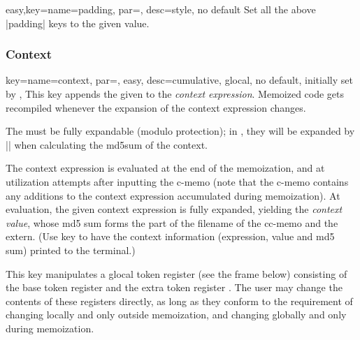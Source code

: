 \documentclass[a4paper,11pt]{article}
\begin{document}
\begin{doc}{easy,key={name=padding, par=, desc={style, no default}}}
  Set all the above |padding| keys to the given value.
\end{doc}

\subsubsection{Context}
\label{sec:ref:memoization:context}

\begin{doc}{
    key={name=context, par=, easy, desc={cumulative, glocal,
        no default, initially set by }},
  }
  This key appends the given  to the \emph{context expression}.
  Memoized code gets recompiled whenever the expansion of the context
  expression changes.

  The  must be fully expandable (modulo protection); in
  , they will be expanded by |\protected@edef| when calculating
  the md5sum of the context.

  The context expression is evaluated at the end of the memoization, and at
  utilization attempts after inputting the c-memo (note that the c-memo
  contains any additions to the context expression accumulated during
  memoization).  At evaluation, the given context expression is fully expanded,
  yielding the \emph{context value}, whose md5 sum forms the  part of the filename of the cc-memo and the extern.  (Use key
   to have the context information (expression, value and md5
  sum) printed to the terminal.)

  This key manipulates a glocal token register (see the frame below) consisting
  of the base token register  and the extra token
  register .  The user may change the contents of
  these registers directly, as long as they conform to the requirement of
  changing  locally and only outside memoization, and
  changing  globally and only during memoization.
\end{doc}
\end{document}
